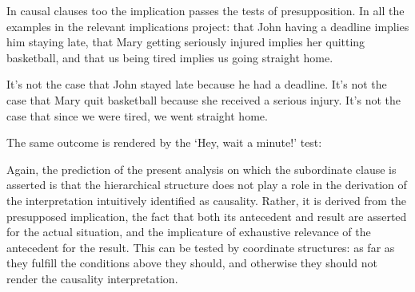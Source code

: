 \documentclass[output=paper]{langscibook}
\begin{document}
In causal clauses too the implication passes the tests of presupposition. In all the examples in  the relevant implications project: that John having a deadline implies him staying late, that Mary getting seriously injured implies her quitting basketball, and that us being tired implies us going straight home.


\ea\label{ex:PresupTest3}
\ea It's not the case that John stayed late because he had a deadline.\label{ex:PresupTest3-a}
\ex It's not the case that Mary quit basketball because she received a serious injury.\label{ex:PresupTest3-b}
\ex It's not the case that since we were tired, we went straight home.\label{ex:PresupTest3-c}
\z\z

\noindent The same outcome is rendered by the `Hey, wait a minute!' test:

\ea\label{ex:PresupTest4}
\ea\label{ex:PresupTest4-a}
        \begin{xlist}
        \end{xlist}
\ex\label{ex:PresupTest4-b}
        \begin{xlist}
        \end{xlist}
\ex\label{ex:PresupTest4-c}
        \begin{xlist}
        \end{xlist}
\z\z

\noindent Again, the prediction of the present analysis on which the subordinate clause is asserted is that the hierarchical structure does not play a role in the derivation of the interpretation intuitively identified as causality. Rather, it is derived from the presupposed implication, the fact that both its antecedent and result are asserted for the actual situation, and the implicature of exhaustive relevance of the antecedent for the result. This can be tested by coordinate structures: as far as they fulfill the conditions above they should, and otherwise they should not render the causality interpretation.
\end{document}
